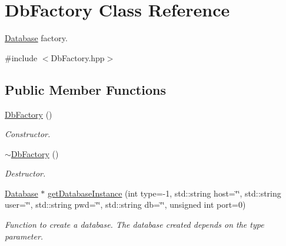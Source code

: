 \hypertarget{classDbFactory}{
\section{DbFactory Class Reference}
\label{classDbFactory}
}


\hyperlink{classDatabase}{Database} factory.  




{\ttfamily \#include $<$DbFactory.hpp$>$}

\subsection*{Public Member Functions}
\begin{DoxyCompactItemize}
\item 
\hypertarget{classDbFactory_ac47baec65bb6d6f591b2fb033bd7c193}{
\hyperlink{classDbFactory_ac47baec65bb6d6f591b2fb033bd7c193}{DbFactory} ()}
\label{classDbFactory_ac47baec65bb6d6f591b2fb033bd7c193}

\begin{DoxyCompactList}\small\item\em Constructor. \item\end{DoxyCompactList}\item 
\hypertarget{classDbFactory_a138084f15091e839a3952c4fe0ccd374}{
\hyperlink{classDbFactory_a138084f15091e839a3952c4fe0ccd374}{$\sim$DbFactory} ()}
\label{classDbFactory_a138084f15091e839a3952c4fe0ccd374}

\begin{DoxyCompactList}\small\item\em Destructor. \item\end{DoxyCompactList}\item 
\hyperlink{classDatabase}{Database} $\ast$ \hyperlink{classDbFactory_ac7826a5f8b460e3447bdeb3a2634f809}{getDatabaseInstance} (int type=-\/1, std::string host=\char`\"{}\char`\"{}, std::string user=\char`\"{}\char`\"{}, std::string pwd=\char`\"{}\char`\"{}, std::string db=\char`\"{}\char`\"{}, unsigned int port=0)
\begin{DoxyCompactList}\small\item\em Function to create a database. The database created depends on the type parameter. \item\end{DoxyCompactList}\end{DoxyCompactItemize}
